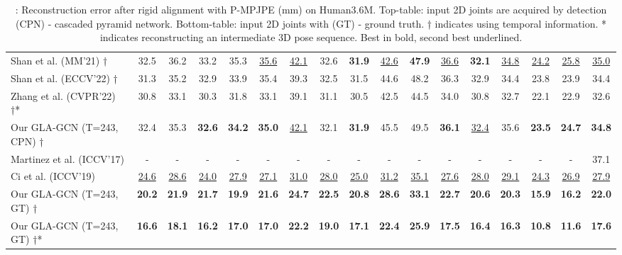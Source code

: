 \documentclass[10pt,twocolumn,letterpaper]{article}
\begin{document}
\begin{table*}[h]
{\begin{tabular}{lcccccccccccccccc}
Shan et al. \cite{shan2021improving} (MM’21) †  &  32.5  &  36.2  &  33.2  &  35.3  &  \underline{35.6}  &  \underline{42.1}  &  32.6  &  \textbf{31.9}  &  \underline{42.6}  &  \textbf{47.9}  &  \underline{36.6}  &  \textbf{32.1}  &  \underline{34.8}  &  \underline{24.2}  &  \underline{25.8}  &  \underline{35.0}  \\
Shan et al. \cite{shan2022p} (ECCV’22) † &  31.3  &  35.2  &  32.9  &  33.9  &  35.4  &  39.3  &  32.5  &  31.5  &  44.6  &  48.2  &  36.3  &  32.9  &  34.4  &  23.8  &  23.9  &  34.4  \\
Zhang et al. \cite{zhang2022mixste} (CVPR’22) †*  &  30.8  &  33.1  &  30.3  &  31.8  &  33.1  &  39.1  &  31.1  &  30.5  &  42.5  &  44.5  &  34.0  &  30.8  &  32.7  &  22.1  &  22.9  &  32.6  \\
    \rowcolor{grayrow}
Our GLA-GCN (T=243, CPN) †  &  32.4  &  35.3  &  \textbf{32.6}  &  \textbf{34.2}  &  \textbf{35.0}  &  \underline{42.1}  &  32.1  &  \textbf{31.9}  &  45.5  &  49.5  &  \textbf{36.1}  &  \underline{32.4}  &  35.6  &  \textbf{23.5}  &  \textbf{24.7}  &  \textbf{34.8}  \\

    \midrule\midrule
  Martinez et al.  \cite{RN011} (ICCV’17)  &  -  &  -  &  -  &  -  &  -  &  -  &  -  &  -  &  -  &  -  &  -  &  -  &  -  &  -  &  -  &  37.1  \\
Ci et al. \cite{RN029} (ICCV’19)   &  \underline{24.6}  &  \underline{28.6}  &  \underline{24.0}  &  \underline{27.9}  &  \underline{27.1}  &  \underline{31.0}  &  \underline{28.0}  &  \underline{25.0}  &  \underline{31.2}  &  \underline{35.1}  &  \underline{27.6} &  \underline{28.0}  &  \underline{29.1}  &  \underline{24.3}  &  \underline{26.9}  &  \underline{27.9}  \\
    \rowcolor{grayrow}
Our GLA-GCN (T=243, GT) † &  \textbf{20.2}  &  \textbf{21.9}  &  \textbf{21.7}  &  \textbf{19.9}  &  \textbf{21.6}  &  \textbf{24.7}  &  \textbf{22.5}  &  \textbf{20.8}  &  \textbf{28.6}  &  \textbf{33.1}  &  \textbf{22.7}  &  \textbf{20.6}  &  \textbf{20.3}  &  \textbf{15.9}  &  \textbf{16.2}  &  \textbf{22.0}  \\

  \rowcolor{grayrow}
Our GLA-GCN (T=243, GT) †* &  \textbf{16.6}  &  \textbf{18.1}  &  \textbf{16.2}  &  \textbf{17.0}  &  \textbf{17.0}  &  \textbf{22.2}  &  \textbf{19.0}  &  \textbf{17.1}  &  \textbf{22.4}  &  \textbf{25.9}  &  \textbf{17.5}  &  \textbf{16.4}  &  \textbf{16.3}  &  \textbf{10.8}  &  \textbf{11.6}  &  \textbf{17.6}  \\
        \bottomrule
  \end{tabular}}
\caption{: Reconstruction error  after rigid alignment with P-MPJPE (mm) on Human3.6M. Top-table: input 2D joints are acquired by detection (CPN) - cascaded pyramid network. Bottom-table: input 2D joints with (GT) - ground truth. † indicates using temporal information. * indicates reconstructing an intermediate 3D pose sequence.  Best in bold, second best underlined.}
  \label{compare2sota_p2}  
\end{table*}
\end{document}
